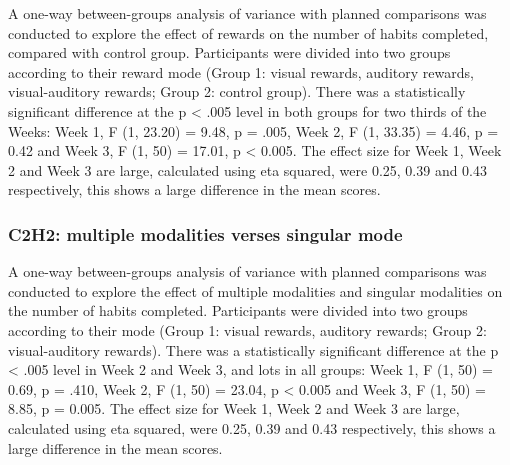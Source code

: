 \documentclass{scaffold/sigchi}
\begin{document}
A one-way between-groups analysis of variance with planned comparisons was conducted to explore the effect of rewards on the number of habits completed, compared with control group. Participants were divided into two groups according to their reward mode (Group 1: visual rewards, auditory rewards, visual-auditory rewards; Group 2: control group). There was a statistically significant difference at the p < .005 level in both groups for two thirds of the Weeks: Week 1, F (1, 23.20) = 9.48, p = .005, Week 2, F (1, 33.35) = 4.46, p = 0.42 and Week 3, F (1, 50) = 17.01, p < 0.005. The effect size for Week 1, Week 2 and Week 3 are large, calculated using eta squared, were 0.25, 0.39 and 0.43 respectively, this shows a large difference in the mean scores.

\subsubsection{C2H2: multiple modalities verses singular mode}

A one-way between-groups analysis of variance with planned comparisons was conducted to explore the effect of multiple modalities and singular modalities on the number of habits completed. Participants were divided into two groups according to their mode (Group 1: visual rewards, auditory rewards; Group 2: visual-auditory rewards). There was a statistically significant difference at the p < .005 level in Week 2 and Week 3, and lots in all groups: Week 1, F (1, 50) = 0.69, p = .410, Week 2, F (1, 50) = 23.04, p < 0.005 and Week 3, F (1, 50) = 8.85, p = 0.005. The effect size for Week 1, Week 2 and Week 3 are large, calculated using eta squared, were 0.25, 0.39 and 0.43 respectively, this shows a large difference in the mean scores.
\end{document}
